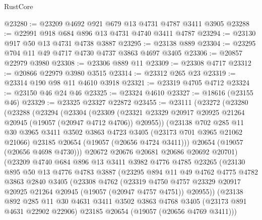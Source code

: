 \begin{lexlean}{RustCore}
\begin{coremodule}
@23280 := @23209 @4692 @921 @679 @13 @4731 @4787 @3411 @3905
@23288 := @22991 @918 @684 @896 @13 @4731 @4740 @3411 @4787
@23294 := @23130 @917 @50 @13 @4731 @4738 @3887
@23295 := @23138 @889
@23304 := @23295 @704 @11 @49 @4717 @4730 @4737 @3863 @4697 @3405
@23306 := @20857 @22979 @3980
@23308 := @23306 @889 @11
@23309 := @23308 @4717
@23312 := @20866 @22979 @3980 @3515
@23314 := @23312 @265 @23
@23319 := @23314 @190 @98 @11 @4610 @3918
@23321 := @23319 @4705 @4712
@23324 := @23150 @46 @24 @46
@23325 := @23324 @4610
@23327 := @18616 (@23155 @46)
@23329 := @23325 @23327 @22872
@23455 := @23111
    (@23272
      (@23280
        (@23288
          (@23294
            (@23304
              (@23309
                (@23321 @23329 @20917 @20925 @21264 @20945 (@19057 (@20947 @4712 @4706)) @20955))
              (@23138
                @702
                @285
                @11
                @30
                @3965
                @3411
                @3502
                @3863
                @4723
                @3405
                (@23173 @701 @3965 @21062 @21066)
                @23185
                @20654
                (@19057 (@20656 @4724 @3411)))
              @20654
              (@19057 (@20656 @4698 @4730)))
            @20672
            @20676
            @20681
            @20686
            @20692
            @20701)
          (@23209
            @4740
            @684
            @896
            @13
            @3411
            @3982
            @4776
            @4785
            @23265
            (@23130
              @895
              @50
              @13
              @4776
              @4783
              @3887
              (@23295
                @894
                @11
                @49
                @4762
                @4775
                @4782
                @3863
                @2840
                @3405
                (@23308
                  @4762
                  (@23319
                    @4750
                    @4757
                    @23329
                    @20917
                    @20925
                    @21264
                    @20945
                    (@19057 (@20947 @4757 @4751))
                    @20955))
                (@23138
                  @892
                  @285
                  @11
                  @30
                  @4631
                  @3411
                  @3502
                  @3863
                  @4768
                  @3405
                  (@23173 @891 @4631 @22902 @22906)
                  @23185
                  @20654
                  (@19057 (@20656 @4769 @3411)))

\end{coremodule}
\end{lexlean}
